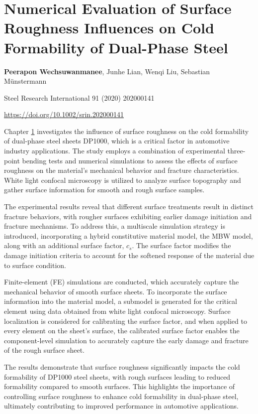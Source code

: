 \chapter[bending]{Numerical Evaluation of Surface Roughness Influences on Cold Formability of Dual-Phase Steel}\label{ch:bending}
\begin{center}

    \textbf{Peerapon Wechsuwanmanee}, Junhe Lian, Wenqi Liu, Sebastian Münstermann
    
    \vspace{20pt}
    
    Steel Research International 91 (2020) 202000141
    
    \vspace{20pt}
    
    \url{https://doi.org/10.1002/srin.202000141}
    
    \vspace{40pt}
    
\end{center}
Chapter \ref{ch:bending} investigates the influence of surface roughness on the cold formability of dual-phase steel sheets DP1000, which is a critical factor in automotive industry applications. The study employs a combination of experimental three-point bending tests and numerical simulations to assess the effects of surface roughness on the material's mechanical behavior and fracture characteristics. White light confocal microscopy is utilized to analyze surface topography and gather surface information for smooth and rough surface samples.

The experimental results reveal that different surface treatments result in distinct fracture behaviors, with rougher surfaces exhibiting earlier damage initiation and fracture mechanisms. To address this, a multiscale simulation strategy is introduced, incorporating a hybrid constitutive material model, the MBW model, along with an additional surface factor, ${c_s}$. The surface factor modifies the damage initiation criteria to account for the softened response of the material due to surface condition.

Finite-element (FE) simulations are conducted, which accurately capture the mechanical behavior of smooth surface sheets. To incorporate the surface information into the material model, a submodel is generated for the critical element using data obtained from white light confocal microscopy. Surface localization is considered for calibrating the surface factor, and when applied to every element on the sheet's surface, the calibrated surface factor enables the component-level simulation to accurately capture the early damage and fracture of the rough surface sheet.

The results demonstrate that surface roughness significantly impacts the cold formability of DP1000 steel sheets, with rough surfaces leading to reduced formability compared to smooth surfaces. This highlights the importance of controlling surface roughness to enhance cold formability in dual-phase steel, ultimately contributing to improved performance in automotive applications. 